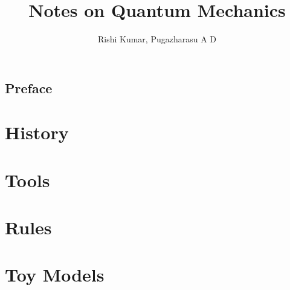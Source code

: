 \documentclass[a4paper,12pt]{book}
\begin{document}
\author{Rishi Kumar, Pugazharasu A D}
\title{Notes on Quantum Mechanics}


\frontmatter
\maketitle
\tableofcontents
\chapter{Preface}

\mainmatter
\part{History}

\part{Tools}

\part{Rules}

\part{Toy Models}

\end{document}
